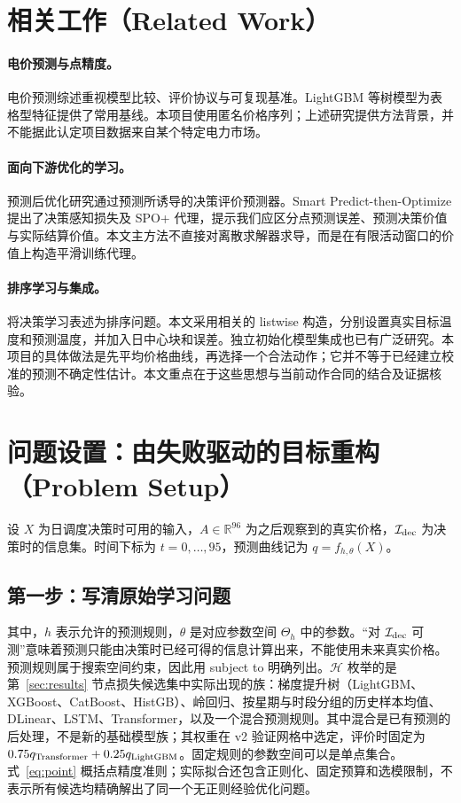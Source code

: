 \documentclass[11pt,a4paper]{article}
\begin{document}
\section{相关工作（Related Work）}
\paragraph{电价预测与点精度。}
电价预测综述重视模型比较、评价协议与可复现基准\citep{lago2021}。LightGBM 等树模型为表格型特征提供了常用基线\citep{ke2017}。本项目使用匿名价格序列；上述研究提供方法背景，并不能据此认定项目数据来自某个特定电力市场。

\paragraph{面向下游优化的学习。}
预测后优化研究通过预测所诱导的决策评价预测器。Smart Predict-then-Optimize 提出了决策感知损失及 SPO+ 代理\citep{elmachtoub2022}，提示我们应区分点预测误差、预测决策价值与实际结算价值。本文主方法不直接对离散求解器求导，而是在有限活动窗口的价值上构造平滑训练代理。

\paragraph{排序学习与集成。}
\citet{mandi2022} 将决策学习表述为排序问题。本文采用相关的 listwise 构造，分别设置真实目标温度和预测温度，并加入日中心块和误差。独立初始化模型集成也已有广泛研究\citep{lakshminarayanan2017}。本项目的具体做法是先平均价格曲线，再选择一个合法动作；它并不等于已经建立校准的预测不确定性估计。本文重点在于这些思想与当前动作合同的结合及证据核验。

\section{问题设置：由失败驱动的目标重构（Problem Setup）}
设 $X$ 为日调度决策时可用的输入，$A\in\mathbb R^{96}$ 为之后观察到的真实价格，$\mathcal I_{\rm dec}$ 为决策时的信息集。时间下标为 $t=0,\ldots,95$，预测曲线记为 $q=f_{h,\theta}(X)$。

\subsection{第一步：写清原始学习问题}
\EqPoint
其中，$h$ 表示允许的预测规则，$\theta$ 是对应参数空间 $\Theta_h$ 中的参数。“对 $\mathcal I_{\rm dec}$ 可测”意味着预测只能由决策时已经可得的信息计算出来，不能使用未来真实价格。预测规则属于搜索空间约束，因此用 subject to 明确列出。$\mathcal H$ 枚举的是第~\ref{sec:results} 节点损失候选集中实际出现的族：梯度提升树（LightGBM、XGBoost、CatBoost、HistGB）、岭回归、按星期与时段分组的历史样本均值、DLinear、LSTM、Transformer，以及一个混合预测规则。其中混合是已有预测的后处理，不是新的基础模型族；其权重在 v2 验证网格中选定，评价时固定为 $0.75q_{\rm Transformer}+0.25q_{\rm LightGBM}$。固定规则的参数空间可以是单点集合。式~\eqref{eq:point} 概括点精度准则；实际拟合还包含正则化、固定预算和选模限制，不表示所有候选均精确解出了同一个无正则经验优化问题。
\end{document}
